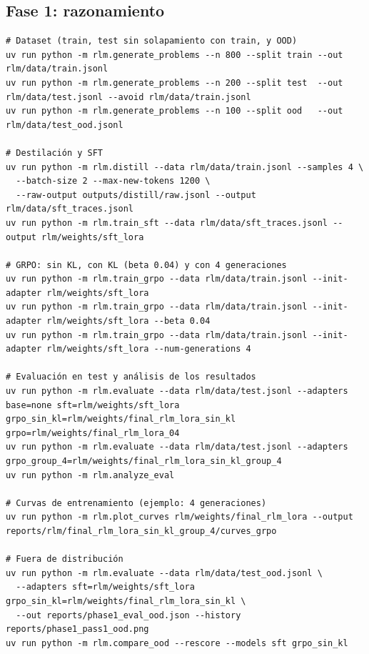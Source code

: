\subsection*{Fase 1: razonamiento}
\begin{lstlisting}
# Dataset (train, test sin solapamiento con train, y OOD)
uv run python -m rlm.generate_problems --n 800 --split train --out rlm/data/train.jsonl
uv run python -m rlm.generate_problems --n 200 --split test  --out rlm/data/test.jsonl --avoid rlm/data/train.jsonl
uv run python -m rlm.generate_problems --n 100 --split ood   --out rlm/data/test_ood.jsonl

# Destilación y SFT
uv run python -m rlm.distill --data rlm/data/train.jsonl --samples 4 \
  --batch-size 2 --max-new-tokens 1200 \
  --raw-output outputs/distill/raw.jsonl --output rlm/data/sft_traces.jsonl
uv run python -m rlm.train_sft --data rlm/data/sft_traces.jsonl --output rlm/weights/sft_lora

# GRPO: sin KL, con KL (beta 0.04) y con 4 generaciones
uv run python -m rlm.train_grpo --data rlm/data/train.jsonl --init-adapter rlm/weights/sft_lora
uv run python -m rlm.train_grpo --data rlm/data/train.jsonl --init-adapter rlm/weights/sft_lora --beta 0.04
uv run python -m rlm.train_grpo --data rlm/data/train.jsonl --init-adapter rlm/weights/sft_lora --num-generations 4

# Evaluación en test y análisis de los resultados
uv run python -m rlm.evaluate --data rlm/data/test.jsonl --adapters base=none sft=rlm/weights/sft_lora grpo_sin_kl=rlm/weights/final_rlm_lora_sin_kl grpo=rlm/weights/final_rlm_lora_04
uv run python -m rlm.evaluate --data rlm/data/test.jsonl --adapters grpo_group_4=rlm/weights/final_rlm_lora_sin_kl_group_4
uv run python -m rlm.analyze_eval

# Curvas de entrenamiento (ejemplo: 4 generaciones)
uv run python -m rlm.plot_curves rlm/weights/final_rlm_lora --output reports/rlm/final_rlm_lora_sin_kl_group_4/curves_grpo

# Fuera de distribución
uv run python -m rlm.evaluate --data rlm/data/test_ood.jsonl \
  --adapters sft=rlm/weights/sft_lora grpo_sin_kl=rlm/weights/final_rlm_lora_sin_kl \
  --out reports/phase1_eval_ood.json --history reports/phase1_pass1_ood.png
uv run python -m rlm.compare_ood --rescore --models sft grpo_sin_kl
\end{lstlisting}

